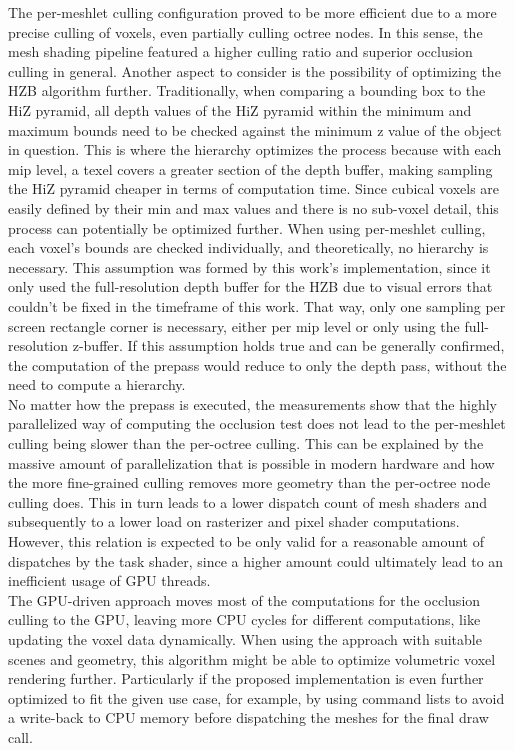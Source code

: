 \noindent
The per-meshlet culling configuration proved to be more efficient due to a more precise culling of voxels, even partially 
culling octree nodes. In this sense, the mesh shading pipeline featured a higher culling ratio and superior occlusion 
culling in general. Another aspect to consider is the possibility of optimizing the \ac{HZB} algorithm further. 
Traditionally, when comparing a bounding box to the \ac{HiZ} pyramid, all depth values of the \ac{HiZ} pyramid within the 
minimum and maximum bounds need to be checked against the minimum z value of the object in question. This is where the 
hierarchy optimizes the process because with each mip level, a texel covers a greater section of the depth buffer, making 
sampling the \ac{HiZ} pyramid cheaper in terms of computation time. Since cubical voxels are easily defined by their min 
and max values and there is no sub-voxel detail, this process can potentially be optimized further. When using per-meshlet 
culling, each voxel's bounds are checked individually, and theoretically, no hierarchy is necessary. This assumption was 
formed by this work's implementation, since it only used the full-resolution depth buffer for the \ac{HZB} due to visual 
errors that couldn't be fixed in the timeframe of this work. That way, only one sampling per screen rectangle corner is 
necessary, either per mip level or only using the full-resolution z-buffer. If this assumption holds true and can be 
generally confirmed, the computation of the prepass would reduce to only the depth pass, without the need to compute a 
hierarchy. \\

\noindent
No matter how the prepass is executed, the measurements show that the highly parallelized way of computing the occlusion 
test does not lead to the per-meshlet culling being slower than the per-octree culling. This can be explained by the 
massive amount of parallelization that is possible in modern hardware and how the more fine-grained culling removes more 
geometry than the per-octree node culling does. This in turn leads to a lower dispatch count of mesh shaders and 
subsequently to a lower load on rasterizer and pixel shader computations. However, this relation is expected to be only 
valid for a reasonable amount of dispatches by the task shader, since a higher amount could ultimately lead to an 
inefficient usage of \ac{GPU} threads. \\

\noindent
The \ac{GPU}-driven approach moves most of the computations for the occlusion culling to the \ac{GPU}, leaving more 
\ac{CPU} cycles for different computations, like updating the voxel data dynamically. When using the approach with 
suitable scenes and geometry, this algorithm might be able to optimize volumetric voxel rendering further. Particularly 
if the proposed implementation is even further optimized to fit the given use case, for example, by using command lists 
to avoid a write-back to \ac{CPU} memory before dispatching the meshes for the final draw call. \\

